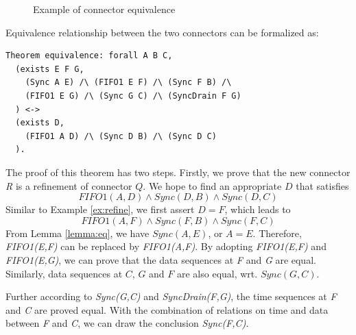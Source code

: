 \documentclass[preprint,3p]{elsarticle}
\begin{document}
\begin{figure}[htb]
\vspace{0cm}
\centering
{}
\caption{Example of connector equivalence}
\label{refine1}

\end{figure}

Equivalence relationship between the two connectors can be formalized as:
\begin{lstlisting}[language=coq]
Theorem equivalence: forall A B C,
  (exists E F G,
    (Sync A E) /\ (FIFO1 E F) /\ (Sync F B) /\
    (FIFO1 E G) /\ (Sync G C) /\ (SyncDrain F G)
  ) <->
  (exists D,
    (FIFO1 A D) /\ (Sync D B) /\ (Sync D C)
  ).
\end{lstlisting}
The proof of this theorem has two steps. Firstly, we prove that the new connector \emph{R} is a refinement of connector $Q$.
We hope to find an appropriate \emph{$D$} that satisfies
\[
FIFO1(A,D)\wedge Sync(D,B) \wedge Sync(D,C)
\]
Similar to Example \ref{ex:refine}, we first assert $D=F$, which leads to
\[
FIFO1(A,F) \land Sync(F,B) \wedge Sync(F,C)
\]
From Lemma \ref{lemma:eq}, we have $Sync(A,E)$, or $A=E$. Therefore, \emph{FIFO1(E,F)} can be replaced by \emph{FIFO1(A,F)}. By adopting \emph{FIFO1(E,F)} and \emph{FIFO1(E,G)}, we can prove that the data sequences at \emph{F} and \emph{G} are equal. Similarly, data sequences at $C$, $G$ and $F$ are also equal, wrt. $Sync(G,C)$.

Further according to \emph{Sync(G,C)} and \emph{SyncDrain(F,G)}, the time sequences at \emph{F} and \emph{C} are proved equal. With the combination of relations on time and data between \emph{F} and \emph{C}, we can draw the conclusion \emph{Sync(F,C)}.
\end{document}
